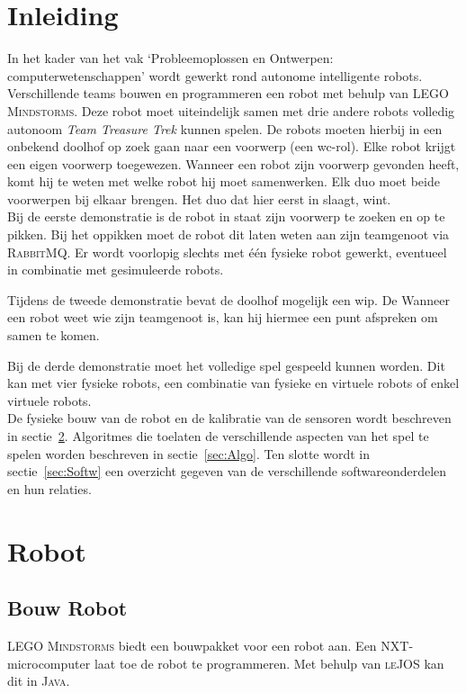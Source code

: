 \documentclass[eind]{penoverslag}
\begin{document}
\newpage
\setcounter{tocdepth}{3}
\tableofcontents
\newpage

\section{Inleiding} %
\label{ssec:Inl}
In het kader van het vak `Probleemoplossen en Ontwerpen: computerwetenschappen' wordt gewerkt rond autonome intelligente robots. Verschillende teams bouwen en programmeren een robot met behulp van \textsc{LEGO Mindstorms}. Deze robot moet uiteindelijk samen met drie andere robots volledig autonoom \textit{Team Treasure Trek} kunnen spelen.
De robots moeten hierbij in een onbekend doolhof op zoek gaan naar een voorwerp (een wc-rol). Elke robot krijgt een eigen voorwerp toegewezen. Wanneer een robot zijn voorwerp gevonden heeft, komt hij te weten met welke robot hij moet samenwerken. Elk duo moet beide voorwerpen bij elkaar brengen. Het duo dat hier eerst in slaagt, wint.\\

Bij de eerste demonstratie is de robot in staat zijn voorwerp te zoeken en op te pikken. Bij het oppikken moet de robot dit laten weten aan zijn teamgenoot via \textsc{RabbitMQ}. Er wordt voorlopig slechts met \'e\'en fysieke robot gewerkt, eventueel in combinatie met gesimuleerde robots.

Tijdens de tweede demonstratie bevat de doolhof mogelijk een wip. De  Wanneer een robot weet wie zijn teamgenoot is, kan hij hiermee een punt afspreken om samen te komen.

Bij de derde demonstratie moet het volledige spel gespeeld kunnen worden. Dit kan met vier fysieke robots, een combinatie van fysieke en virtuele robots of enkel virtuele robots.\\

De fysieke bouw van de robot en de kalibratie van de sensoren wordt beschreven in sectie~\ref{sec:Robot}. Algoritmes die toelaten de verschillende aspecten van het spel te spelen worden beschreven in sectie~\ref{sec:Algo}. Ten slotte wordt in sectie~\ref{sec:Softw} een overzicht gegeven van de verschillende softwareonderdelen en hun relaties.

\section{Robot}
\label{sec:Robot}

\subsection{Bouw Robot}
\label{ssec:Bouw}
\textsc{LEGO Mindstorms} biedt een bouwpakket voor een robot aan. Een \textsc{NXT}-microcomputer laat toe de robot te programmeren. Met behulp van \textsc{leJOS} kan dit in \textsc{Java}.\\
\end{document}
